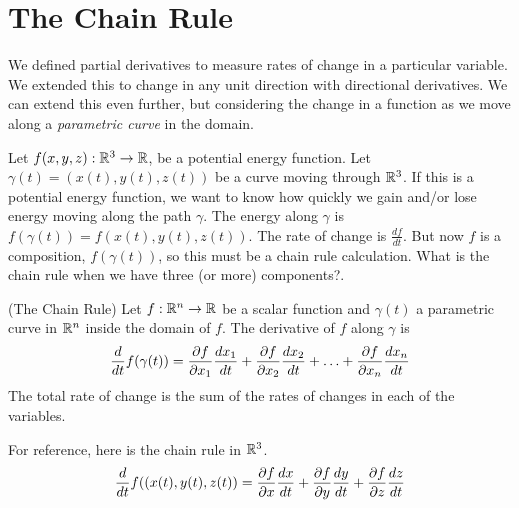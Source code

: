 \documentclass[fleqn,letterpaper]{report}
\begin{document}
\section{The Chain Rule}
\label{chain-rule}

We defined partial derivatives to measure rates of change in a
particular variable. We extended this to change in any unit
direction with directional derivatives. We can extend this
even further, but considering the change in a function as we
move along a \emph{parametric curve} in the domain. 

Let $f(x,y,z): \mathbb{R}^3 \rightarrow\mathbb{R}$, be a potential energy
function. Let $\gamma(t) = (x(t), y(t), z(t))$ be a curve
moving through $\mathbb{R}^3$.  If this is a potential energy
function, we want to know how quickly we gain and/or lose
energy moving along the path $\gamma$. The energy along
$\gamma$ is $f(\gamma(t)) = f(x(t), y(t), z(t))$. The rate of
change is $\frac{df}{dt}$.  But now $f$ is a composition,
$f(\gamma(t))$, so this must be a chain rule calculation. What
is the chain rule when we have three (or more) components?.

\begin{prop}
(The Chain Rule) Let $f: \mathbb{R}^n \rightarrow \mathbb{R}$ be a scalar
function and $\gamma(t)$ a parametric curve in $\mathbb{R}^n$ inside
the domain of $f$. The derivative of $f$ along $\gamma$ is 
\begin{equation*}
\frac{d}{dt} f(\gamma(t)) = 
\frac{\partial f}{\partial x_1} \frac{dx_1}{dt} + 
\frac{\partial f}{\partial x_2} \frac{dx_2}{dt} + \ldots + 
\frac{\partial f}{\partial x_n} \frac{dx_n}{dt} 
\end{equation*}
The total rate of change is the sum of the rates of changes in
each of the variables. 
\end{prop}

For reference, here is the chain rule in $\mathbb{R}^3$.
\begin{equation*}
\frac{d}{dt} f((x(t), y(t), z(t)) = 
\frac{\partial f}{\partial x} \frac{dx}{dt} + 
\frac{\partial f}{\partial y} \frac{dy}{dt} + 
\frac{\partial f}{\partial z} \frac{dz}{dt} 
\end{equation*}
\end{document}
